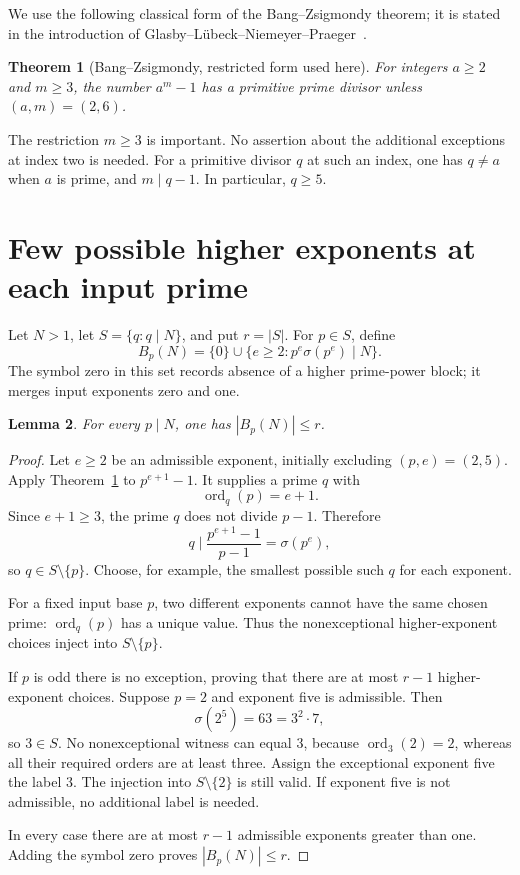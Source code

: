 \documentclass[11pt]{article}
\newtheorem{theorem}{Theorem}[section]
\newtheorem{lemma}[theorem]{Lemma}
\DeclareMathOperator{\ord}{ord}
\begin{document}
We use the following classical form of the Bang--Zsigmondy theorem; it is stated in the introduction of Glasby--L\"ubeck--Niemeyer--Praeger~\cite{zsig}.

\begin{theorem}[Bang--Zsigmondy, restricted form used here]\label{thm:bang}
For integers $a\ge2$ and $m\ge3$, the number $a^m-1$ has a primitive prime divisor unless $(a,m)=(2,6)$.
\end{theorem}

The restriction $m\ge3$ is important. No assertion about the additional exceptions at index two is needed. For a primitive divisor $q$ at such an index, one has $q\ne a$ when $a$ is prime, and $m\mid q-1$. In particular, $q\ge5$.

\section{Few possible higher exponents at each input prime}
Let $N>1$, let $S=\{q:q\mid N\}$, and put $r=|S|$. For $p\in S$, define
\[
 B_p(N)=\{0\}\cup\{e\ge2:p^e\sigma(p^e)\mid N\}.
\]
The symbol zero in this set records absence of a higher prime-power block; it merges input exponents zero and one.

\begin{lemma}\label{lem:listsize}
For every $p\mid N$, one has $|B_p(N)|\le r$.
\end{lemma}
\begin{proof}
Let $e\ge2$ be an admissible exponent, initially excluding $(p,e)=(2,5)$. Apply Theorem~\ref{thm:bang} to $p^{e+1}-1$. It supplies a prime $q$ with
\[
 \ord_q(p)=e+1.
\]
Since $e+1\ge3$, the prime $q$ does not divide $p-1$. Therefore
\[
 q\mid\frac{p^{e+1}-1}{p-1}=\sigma(p^e),
\]
so $q\in S\setminus\{p\}$. Choose, for example, the smallest possible such $q$ for each exponent.

For a fixed input base $p$, two different exponents cannot have the same chosen prime: $\ord_q(p)$ has a unique value. Thus the nonexceptional higher-exponent choices inject into $S\setminus\{p\}$.

If $p$ is odd there is no exception, proving that there are at most $r-1$ higher-exponent choices. Suppose $p=2$ and exponent five is admissible. Then
\[
 \sigma(2^5)=63=3^2\cdot7,
\]
so $3\in S$. No nonexceptional witness can equal $3$, because $\ord_3(2)=2$, whereas all their required orders are at least three. Assign the exceptional exponent five the label $3$. The injection into $S\setminus\{2\}$ is still valid. If exponent five is not admissible, no additional label is needed.

In every case there are at most $r-1$ admissible exponents greater than one. Adding the symbol zero proves $|B_p(N)|\le r$.
\end{proof}
\end{document}
